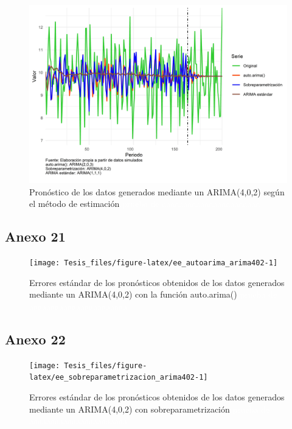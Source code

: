 \documentclass[
]{article}
\begin{document}
\begin{figure}[H]
\includegraphics[width=1\linewidth,height=1\textheight]{Tesis_files/figure-latex/pronostico_arima402-1} \caption{Pronóstico de los datos generados mediante un ARIMA(4,0,2) según el método de estimación \textcolor{white}{prueba de aaaaaaaaaaaaaaaaaaaaaaa}}\label{fig:pronostico_arima402}
\end{figure}

\subsection{Anexo 21}

\begin{figure}[H]
\texttt{[image: Tesis\_files/figure-latex/ee\_autoarima\_arima402-1]} \caption{Errores estándar de los pronósticos obtenidos de los datos generados mediante un ARIMA(4,0,2) con la función auto.arima() \textcolor{white}{prueba de aaaaaaaaaaaaaaaaaaaaaaa}}\label{fig:ee_autoarima_arima402}
\end{figure}

\subsection{Anexo 22}

\begin{figure}[H]
\texttt{[image: Tesis\_files/figure-latex/ee\_sobreparametrizacion\_arima402-1]} \caption{Errores estándar de los pronósticos obtenidos de los datos generados mediante un ARIMA(4,0,2) con sobreparametrización \textcolor{white}{prueba de aaaaaaaaaaaaaaaaaaaaaaa}}\label{fig:ee_sobreparametrizacion_arima402}
\end{figure}
\end{document}

